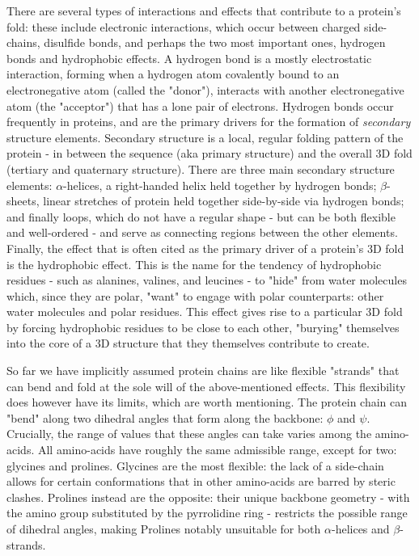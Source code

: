 There are several types of interactions and effects that contribute to a protein's fold: these include electronic interactions, 
which occur between charged side-chains, disulfide bonds, and perhaps the two most important ones, hydrogen bonds and hydrophobic effects.
A hydrogen bond is a mostly electrostatic interaction, forming when a hydrogen atom covalently bound to an electronegative
atom (called the "donor"), interacts with another electronegative atom (the "acceptor") that has a lone pair of electrons.
Hydrogen bonds occur frequently in proteins, and are the primary drivers for the formation of \textit{secondary} structure
elements. Secondary structure is a local, regular folding pattern of the protein - in between the sequence (aka primary structure)
and the overall 3D fold (tertiary and quaternary structure). There are three main secondary structure elements: $\alpha$-helices, a right-handed 
helix held together by hydrogen bonds; $\beta$-sheets, linear stretches of protein held together side-by-side via hydrogen bonds;
and finally loops, which do not have a regular shape - but can be both flexible and well-ordered - and serve as connecting regions
between the other elements.
Finally, the effect that is often cited as the primary driver of a protein's 3D fold is the hydrophobic effect.
This is the name for the tendency of hydrophobic residues - such as alanines, valines, and leucines - to "hide" from water
molecules which, since they are polar, "want" to engage with polar counterparts: other water molecules and polar residues.
This effect gives rise to a particular 3D fold by forcing hydrophobic residues to be close to each other, "burying" themselves
into the core of a 3D structure that they themselves contribute to create.

So far we have implicitly assumed protein chains are like flexible "strands" that can bend and fold
at the sole will of the above-mentioned effects.
This flexibility does however have its limits, which are worth mentioning.
The protein chain can "bend" along two dihedral angles that form along the backbone: $\phi$ and $\psi$. 
Crucially, the range of values that these angles can take varies among the amino-acids.
All amino-acids have roughly the same admissible range, except for two: glycines and prolines.
Glycines are the most flexible: the lack of a side-chain allows for certain conformations that in other amino-acids are barred
by steric clashes.
Prolines instead are the opposite: their unique backbone geometry - with the amino group substituted by the pyrrolidine ring -
restricts the possible range of dihedral angles, making Prolines notably unsuitable for both $\alpha$-helices and $\beta$-strands.


